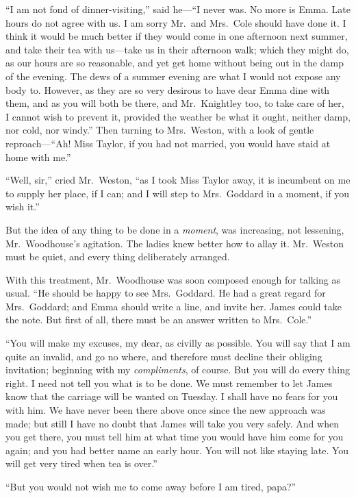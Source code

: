 ``I am not fond of dinner-visiting,'' said he---``I never was.
No more is Emma.  Late hours do not agree with us.  I am sorry
Mr.\ and Mrs.\ Cole should have done it.  I think it would be
much better if they would come in one afternoon next summer,
and take their tea with us---take us in their afternoon walk;
which they might do, as our hours are so reasonable, and yet get home
without being out in the damp of the evening.  The dews of a summer
evening are what I would not expose any body to.  However, as they
are so very desirous to have dear Emma dine with them, and as you
will both be there, and Mr.\ Knightley too, to take care of her,
I cannot wish to prevent it, provided the weather be what it ought,
neither damp, nor cold, nor windy.''  Then turning to Mrs.\ Weston,
with a look of gentle reproach---``Ah!  Miss Taylor, if you had
not married, you would have staid at home with me.''

``Well, sir,'' cried Mr.\ Weston, ``as I took Miss Taylor away,
it is incumbent on me to supply her place, if I can; and I will
step to Mrs.\ Goddard in a moment, if you wish it.''

But the idea of any thing to be done in a \emph{moment}, was increasing,
not lessening, Mr.\ Woodhouse's agitation.  The ladies knew better
how to allay it.  Mr.\ Weston must be quiet, and every thing
deliberately arranged.

With this treatment, Mr.\ Woodhouse was soon composed enough
for talking as usual.  ``He should be happy to see Mrs.\ Goddard.
He had a great regard for Mrs.\ Goddard; and Emma should write a line,
and invite her.  James could take the note.  But first of all,
there must be an answer written to Mrs.\ Cole.''

``You will make my excuses, my dear, as civilly as possible.  You will
say that I am quite an invalid, and go no where, and therefore must
decline their obliging invitation; beginning with my \emph{compliments},
of course.  But you will do every thing right.  I need not tell you
what is to be done.  We must remember to let James know that the carriage
will be wanted on Tuesday.  I shall have no fears for you with him.
We have never been there above once since the new approach was made;
but still I have no doubt that James will take you very safely.
And when you get there, you must tell him at what time you would
have him come for you again; and you had better name an early hour.
You will not like staying late.  You will get very tired when tea
is over.''

``But you would not wish me to come away before I am tired, papa?''

